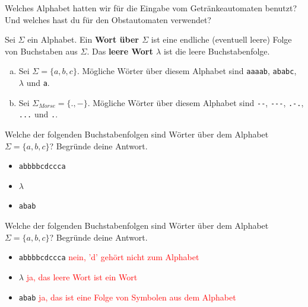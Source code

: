 \documentclass{article}
\begin{document}
\begin{exercise}
Welches Alphabet hatten wir für die Eingabe vom Getränkeautomaten benutzt? Und welches hast du für den Obstautomaten verwendet?\\

\blank[width=\linewidth]{}
\end{exercise}

\begin{definition}
Sei \(\Sigma\) ein Alphabet. Ein \textbf{Wort über \(\Sigma\)} ist eine endliche (eventuell leere) Folge von Buchstaben aus \(\Sigma\). Das \textbf{leere Wort \(\lambda\)} ist die leere Buchstabenfolge.
\end{definition}

\begin{example}
\begin{enumerate}[(a)]
    \item Sei \(\Sigma = \{a, b, c\}\). Mögliche Wörter über diesem Alphabet sind \texttt{aaaab}, \texttt{ababc}, \(\lambda\) und \texttt{a}.
    \item Sei \(\Sigma_{Morse} = \{.,-\}\). Mögliche Wörter über diesem Alphabet sind \verb|--|, \verb|---|, \verb|.-.|, \verb|...| und \verb|.|.
\end{enumerate}
\end{example}

\begin{exercise}
Welche der folgenden Buchstabenfolgen sind Wörter über dem Alphabet \(\Sigma = \{a, b, c\}\)? Begründe deine Antwort.
\begin{itemize}[label=$\square$]
    \item \texttt{abbbbcdccca}
    \item \(\lambda\)
    \item \texttt{abab}
\end{itemize}
\end{exercise}
\begin{solution}
Welche der folgenden Buchstabenfolgen sind Wörter über dem Alphabet \(\Sigma = \{a, b, c\}\)? Begründe deine Antwort.
\begin{itemize}[label=$\square$]
    \item \texttt{abbbbcdccca} \hfill \textcolor{red}{nein, 'd' gehört nicht zum Alphabet}
    \item \(\lambda\) \hfill \textcolor{red}{ja, das leere Wort ist ein Wort}
    \item \texttt{abab} \hfill \textcolor{red}{ja, das ist eine Folge von Symbolen aus dem Alphabet}
\end{itemize}
\end{solution}
\end{document}
